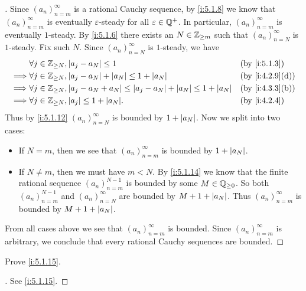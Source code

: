 \begin{proof}[]
  Since \((a_n)_{n = m}^{\infty}\) is a rational Cauchy sequence, by \cref{i:5.1.8} we know that \((a_n)_{n = m}^{\infty}\) is eventually \(\varepsilon\)-steady for all \(\varepsilon \in \mathbb{Q}^+\).
  In particular, \((a_n)_{n = m}^{\infty}\) is eventually \(1\)-steady.
  By \cref{i:5.1.6} there exists an \(N \in \mathbb{Z}_{\geq m}\) such that \((a_n)_{n = N}^{\infty}\) is \(1\)-steady.
  Fix such \(N\).
  Since \((a_n)_{n = N}^\infty\) is \(1\)-steady, we have
  \begin{align*}
             & \forall j \in \Z_{\geq N}, \abs{a_j - a_N} \leq 1                                                    &  & \by{i:5.1.3}    \\
    \implies & \forall j \in \Z_{\geq N}, \abs{a_j - a_N} + \abs{a_N} \leq 1 + \abs{a_N}                            &  & \by{i:4.2.9}[d] \\
    \implies & \forall j \in \Z_{\geq N}, \abs{a_j - a_N + a_N} \leq \abs{a_j - a_N} + \abs{a_N} \leq 1 + \abs{a_N} &  & \by{i:4.3.3}[b] \\
    \implies & \forall j \in \Z_{\geq N}, \abs{a_j} \leq 1 + \abs{a_N}.                                             &  & \by{i:4.2.4}
  \end{align*}
  Thus by \cref{i:5.1.12} \((a_n)_{n = N}^\infty\) is bounded by \(1 + \left\lvert a_N\right\rvert\).
  Now we split into two cases:
  \begin{itemize}
    \item If \(N = m\), then we see that \((a_n)_{n = m}^\infty\) is bounded by \(1 + \left\lvert a_N\right\rvert\).
    \item If \(N \neq m\), then we must have \(m < N\).
          By \cref{i:5.1.14} we know that the finite rational sequence \((a_n)_{n = m}^{N - 1}\) is bounded by some \(M \in \mathbb{Q}_{\geq 0}\).
          So both \((a_n)_{n = m}^{N - 1}\) and \((a_n)_{n = N}^\infty\) are bounded by \(M + 1 + \left\lvert a_N\right\rvert\).
          Thus \((a_n)_{n = m}^\infty\) is bounded by \(M + 1 + \left\lvert a_N\right\rvert\).
  \end{itemize}
  From all cases above we see that \((a_n)_{n = m}^\infty\) is bounded.
  Since \((a_n)_{n = m}^\infty\) is arbitrary, we conclude that every rational Cauchy sequences are bounded.
\end{proof}

\exercisesection

\begin{ex}\label{i:ex:5.1.1}
  Prove \cref{i:5.1.15}.
\end{ex}

\begin{proof}[]
  See \cref{i:5.1.15}.
\end{proof}
